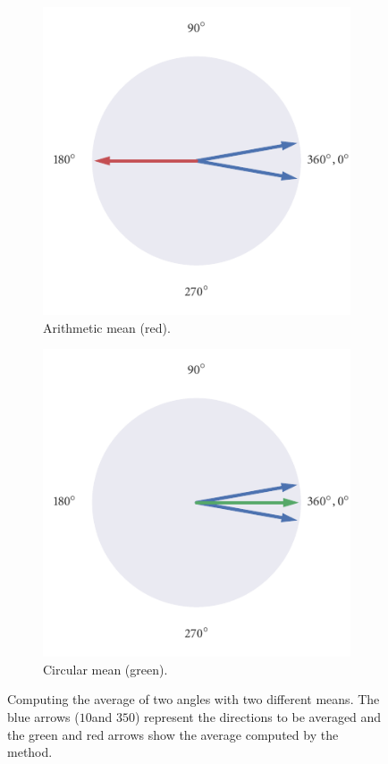 \begin{figure}
	\begin{subfigure}[b]{0.45\textwidth}
		\includegraphics{arith_mean.pdf}
		\caption{Arithmetic mean (red).}
		\label{subfig:arith_mean}
	\end{subfigure}%
	\hspace{0.05\textwidth}
	\begin{subfigure}[b]{0.45\textwidth}
		\includegraphics{circ_mean.pdf}
		\caption{Circular mean (green).}
		\label{subfig:circ_mean}
	\end{subfigure}
	\caption{Computing the average of two angles with two different means. The blue arrows ($10$\textdegree and $350$\textdegree) represent the directions to be averaged and the green and red arrows show the average computed by the method.}
	\label{fig:visualise_mean}
\end{figure}

